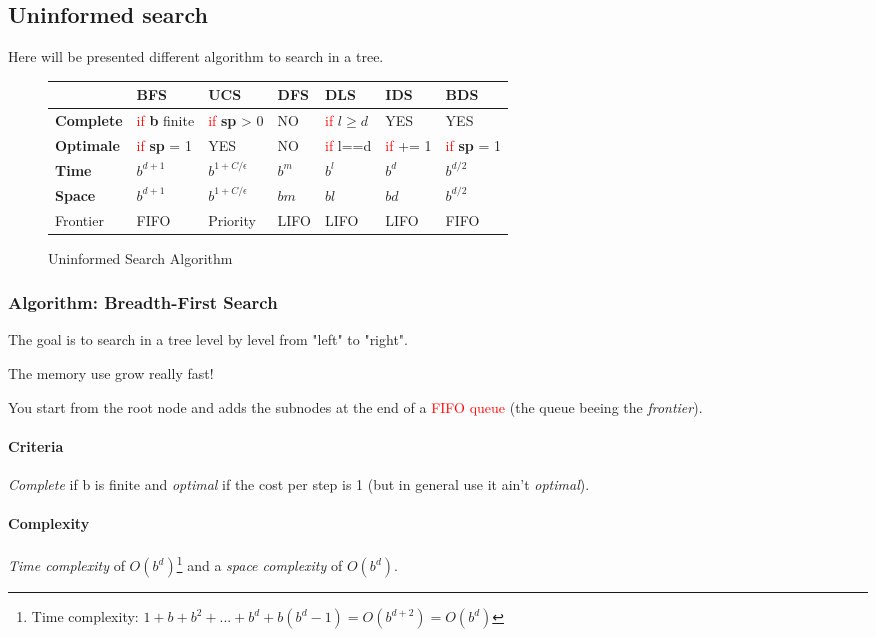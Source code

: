 \subsection{Uninformed search}
Here will be presented different algorithm to search in a tree.

\begin{figure}[h]
\centering
\begin{tabular}{|l|m{2cm}|m{2cm}|m{2cm}|m{2cm}|m{2cm}|m{2cm}|}
\hline
& \textbf{BFS} & \textbf{UCS} & \textbf{DFS} & \textbf{DLS} & \textbf{IDS} & \textbf {BDS}\\

\hline
\hline
\textbf{Complete} & \textcolor{red}{if} \textbf{b} finite & \textcolor{red}{if} \textbf{sp} > 0  & NO  & \textcolor{red}{if} $l\geq d$ & YES & YES\\
\hline
\textbf{Optimale} & \textcolor{red}{if} \textbf{sp} = 1 & YES & NO & \textcolor{red}{if} l==d & \textcolor{red}{if} += 1 & \textcolor{red}{if} \textbf{sp} = 1 \\
\hline
\textbf{Time} & $b^{d+1}$    & $b^{1 + C/\epsilon}$ & $b^m$ & $b^l$ & $b^d$ & $b^{d/2}$\\
\hline
\textbf{Space} & $b^{d+1}$ & $b^{1 + C/\epsilon}$ & $bm$ & $bl$ & $bd$ & $b^{d/2}$ \\
\hline
Frontier & FIFO & Priority & LIFO & LIFO & LIFO & FIFO \\
\hline

\end{tabular}
\caption{Uninformed Search Algorithm}
\end{figure}


\subsubsection{Algorithm: Breadth-First Search}
The goal is to search in a tree level by level from "left" to "right".

The memory use grow really fast! 

You start from the root node and adds the subnodes at the end of a 
\textcolor{red}{FIFO queue} (the queue beeing the \textit{frontier}). 

\paragraph{Criteria} \textit{Complete} if b is finite and \textit{optimal} if the cost per
step is 1 (but in general use it ain't \textit{optimal}).

\paragraph{Complexity} \textit{Time complexity} of $O(b^d)$\footnote{Time complexity: $1+b+b^2+...+b^d+b(b^d-1) = O(b^{d+2}) = O(b^d)$} and a \textit{space complexity} of $O(b^d)$. 


